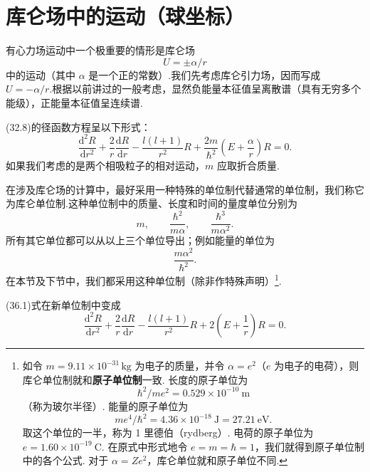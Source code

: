 \section{库仑场中的运动（球坐标）}

有心力场运动中一个极重要的情形是库仑场
\begin{equation*}
  U=\pm\alpha/r
\end{equation*}
中的运动（其中 $\alpha$ 是一个正的常数）.我们先考虑库仑引力场，因而写成 $U=-\alpha/r$.根据以前讲过的一般考虑，显然负能量本征值呈离散谱（具有无穷多个能级），正能量本征值呈连续谱.

(32.8)的径函数方程呈以下形式：
\begin{equation}
  \frac{\mathrm{d}^2R}{\mathrm{d}r^2}+\frac{2}{r}\frac{\mathrm{d}R}{\mathrm{d}r}
  -\frac{l(l+1)}{r^2}R+\frac{2m}{\hbar^2}\left(E+\frac{\alpha}{r}\right)R=0.
\end{equation}
如果我们考虑的是两个相吸粒子的相对运动，$m$ 应取折合质量.

在涉及库仑场的计算中，最好采用一种特殊的单位制代替通常的单位制，我们称它为库仑单位制.这种单位制中的质量、长度和时间的量度单位分别为
\begin{equation*}
  m,\qquad\frac{\hbar^2}{m\alpha},\qquad\frac{\hbar^3}{m\alpha^2}.
\end{equation*}
所有其它单位都可以从以上三个单位导出；例如能量的单位为
\begin{equation*}
  \frac{m\alpha^2}{\hbar^2}.
\end{equation*}
在本节及下节中，我们都采用这种单位制（除非作特殊声明）\footnote{如令 $m=9.11\times10^{-31}\,\mathrm{kg}$ 为电子的质量，并令 $\alpha=e^2$（$e$ 为电子的电荷），则库仑单位制就和\textbf{原子单位制}一致. 长度的原子单位为
\begin{equation*}
  \hbar^2/me^2=0.529\times10^{-10}\ \mathrm{m}
\end{equation*}
（称为玻尔半径）. 能量的原子单位为
\begin{equation*}
  me^4/\hbar^2=4.36\times10^{-18}\ \mathrm{J}=27.21\ \mathrm{eV}.
\end{equation*}
取这个单位的一半，称为 1 里德伯（rydberg）. 电荷的原子单位为 $e=1.60\times10^{-19}\ \mathrm{C}$. 在原式中形式地令 $e=m=\hbar=1$，我们就得到原子单位制中的各个公式. 对于 $\alpha=Ze^2$，库仑单位就和原子单位不同.}.

(36.1)式在新单位制中变成
\begin{equation}
  \frac{\mathrm{d}^2R}{\mathrm{d}r^2}+\frac{2}{r}\frac{\mathrm{d}R}{\mathrm{d}r}
  -\frac{l(l+1)}{r^2}R+2\left(E+\frac{1}{r}\right)R=0.
\end{equation}

